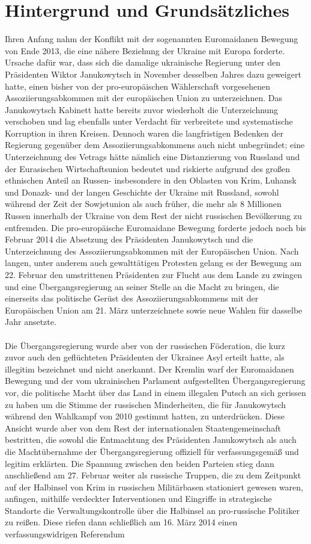 \documentclass[a4paper,11pt]{article}
\begin{document}
	\section{Hintergrund und Grundsätzliches}
Ihren Anfang nahm der Konflikt mit der sogenannten Euromaidanen Bewegung von Ende 2013, die eine nähere Beziehung der Ukraine mit Europa forderte. Ursache dafür war, dass sich die damalige ukrainische Regierung unter den Präsidenten Wiktor Janukowytsch in November desselben Jahres dazu geweigert hatte, einen bisher von der pro-europäischen Wählerschaft vorgesehenen Assoziierungsabkommen mit der europäischen Union zu unterzeichnen. Das Janukowytsch Kabinett hatte bereits zuvor wiederholt die Unterzeichnung verschoben und lag ebenfalls unter Verdacht für verbreitete und systematische Korruption in ihren Kreisen. Dennoch waren die langfristigen Bedenken der Regierung gegenüber dem Assoziierungsabkommens auch nicht unbegründet; eine Unterzeichnung des Vetrags hätte nämlich eine Distanzierung von Russland und der Eurasischen Wirtschaftsunion bedeutet und riskierte aufgrund des großen ethnischen Anteil an Russen- insbesondere in den Oblasten von Krim, Luhansk und Donazk- und der langen Geschichte der Ukraine mit Russland, sowohl während der Zeit der Sowjetunion als auch früher, die mehr als 8 Millionen Russen innerhalb der Ukraine von dem Rest der nicht russischen Bevölkerung zu entfremden. Die pro-europäische Euromaidane Bewegung forderte jedoch noch bis Februar 2014 die Absetzung des Präsidenten Janukowytsch und die Unterzeichnung des Assoziierungsabkommen mit der Europäischen Union. Nach langen, unter anderem auch gewalttätigen Protesten gelang es der Bewegung am 22. Februar den umstrittenen Präsidenten zur Flucht aus dem Lande zu zwingen und eine Übergangsregierung an seiner Stelle an die Macht zu bringen, die einerseits das politische Gerüst des Assoziierungsabkommens mit der Europäischen Union am 21. März unterzeichnete sowie neue Wahlen für dasselbe Jahr ansetzte. \\ \\ Die Übergangsregierung wurde aber von der russischen Föderation, die kurz zuvor auch den geflüchteten Präsidenten der Ukrainee Asyl erteilt hatte, als illegitim bezeichnet und nicht anerkannt. Der Kremlin warf der Euromaidanen Bewegung und der vom ukrainischen Parlament aufgestellten Übergangsregierung vor, die politische Macht über das Land in einem illegalen Putsch an sich gerissen zu haben um die Stimme der russischen Minderheiten, die für Janukowytsch während den Wahlkampf von 2010 gestimmt hatten, zu unterdrücken. Diese Ansicht wurde aber von dem Rest der internationalen Staatengemeinschaft bestritten, die sowohl die Entmachtung des Präsidenten Janukowytsch als auch die Machtübernahme der Übergangsregierung offiziell für verfassungsgemäß und legitim erklärten. Die Spannung zwischen den beiden Parteien stieg dann anschließend am 27. Februar weiter als russische Truppen, die zu dem Zeitpunkt auf der Halbinsel von Krim in russischen Militärbasen stationiert gewesen waren, anfingen, mithilfe verdeckter Interventionen und Eingriffe in strategische Standorte die Verwaltungskontrolle über die Halbinsel an pro-russische Politiker zu reißen. Diese riefen dann schließlich am 16. März 2014 einen verfassungswidrigen Referendum 
\end{document}
